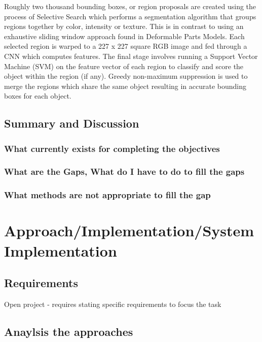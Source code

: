 \documentclass{mproj}
\begin{document}
Roughly two thousand bounding boxes, or region proposals are created using the process of Selective Search which performs a segmentation algorithm that groups regions together by color, intensity or texture.\cite{Sande2013} This is in contrast to using an exhaustive sliding window approach found in Deformable Parts Models.\cite{voc-release4} Each selected region is warped to a 227 x 227 square RGB image and fed through a CNN which computes features. The final stage involves running a Support Vector Machine (SVM) on the feature vector of each region to classify and score the object within the region (if any). Greedy non-maximum suppression is used to merge the regions which share the same object resulting in accurate bounding boxes for each object. 


\section{Summary and Discussion}
\subsection{What currently exists for completing the objectives}
\subsection{What are the Gaps, What do I have to do to fill the gaps}
\subsection{What methods are not appropriate to fill the gap}




\chapter{Approach/Implementation/System Implementation}

\section{Requirements}

Open project - requires stating specific requirements to focus the task
\section{Anaylsis the approaches}
\end{document}
